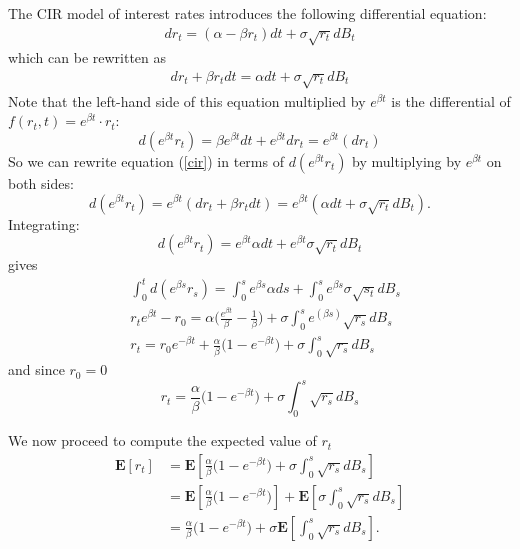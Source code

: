 \documentclass[12pt]{article}
\begin{document}
The CIR model of interest rates introduces the following differential equation:
\begin{align}
dr_t = (\alpha - \beta r_t)dt + \sigma \sqrt{r_t}dB_t
\end{align} 
which can be rewritten as
\begin{align}\label{cir}
dr_t +\beta r_t dt = \alpha dt + \sigma \sqrt{r_t}dB_t
\end{align} 
Note that the left-hand side of this equation multiplied by $e^{\beta t}$ is the differential of $f(r_t,t)=e^{\beta t}\cdot r_t$:
\begin{equation}
d( e^{\beta t} r_t) =  \beta e^{\beta t}dt + e^{\beta t} dr_t = e^{\beta t} \left(dr_t\right)
\end{equation}
So we can rewrite equation (\ref{cir}) in terms of $d( e^{\beta t} r_t)$ by multiplying by  $e^{\beta t}$ on both sides:
\begin{equation}
d( e^{\beta t} r_t)  = e^{\beta t } \left(dr_t+\beta r_t dt\right) =  e^{\beta t } (\alpha dt + \sigma \sqrt{r_t}dB_t).
\end{equation}
Integrating:
\begin{equation}
d( e^{\beta t} r_t)  =  e^{\beta t } \alpha dt +  e^{\beta t } \sigma \sqrt{r_t}dB_t
\end{equation}
gives
\begin{align}
& \int_0^t d( e^{\beta s} r_s) = \int_0^s e^{\beta s} \alpha ds +  \int_0^s e^{\beta s} \sigma \sqrt{s_t}dB_s \\
& r_t e^{\beta t} -r_0 = \alpha \bigg(\frac{e^{\beta t}}{\beta}-\frac{1}{\beta}\bigg) + \sigma \int_0^s e^(\beta s)\sqrt{r_s}dB_s \\
& r_t = r_0 e^{-\beta t} + \frac{\alpha}{\beta} \bigg(1-e^{-\beta t}\bigg) + \sigma \int_0^s \sqrt{r_s}dB_s 
\end{align}
and since $r_0 = 0$
\begin{equation}
\boxed{r_t = \frac{\alpha}{\beta} \bigg(1-e^{-\beta t}\bigg) + \sigma \int_0^s \sqrt{r_s}dB_s }
\end{equation}

We now proceed to compute the expected value of $r_t$
\begin{align}
\mathbf{E}[r_t] &= \mathbf{E} \left[\frac{\alpha}{\beta} \bigg(1-e^{-\beta t}\bigg) + \sigma \int_0^s \sqrt{r_s}dB_s \right] \\
&= \mathbf{E} \left[\frac{\alpha}{\beta} \bigg(1-e^{-\beta t}\bigg)\right] +\mathbf{E}\left[ \sigma \int_0^s \sqrt{r_s}dB_s \right] \\
&= \frac{\alpha}{\beta} \bigg(1-e^{-\beta t}\bigg) +\sigma \mathbf{E}\left[ \int_0^s \sqrt{r_s}dB_s \right] .
\end{align}
\end{document}
